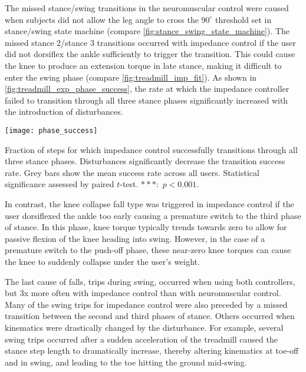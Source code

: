 The missed stance/swing transitions in the neuromuscular control were caused
when subjects did not allow the leg angle to cross the $90^\circ$ threshold set
in stance/swing state machine (compare \cref{fig:stance_swing_state_machine}).
The missed stance 2/stance 3 transitions occurred with impedance control if the
user did not dorsiflex the ankle sufficiently to trigger the transition. This
could cause the knee to produce an extension torque in late stance, making it
difficult to enter the swing phase (compare \cref{fig:treadmill_imp_fit}). As
shown in \cref{fig:treadmill_exp_phase_success}, the rate at which the impedance
controller failed to transition through all three stance phases significantly
increased with the introduction of disturbances.
\begin{marginfigure}[0in]
    \centering 
    \texttt{[image: phase\_success]}
    \caption[Fraction of steps for which impedance control successfully
    transitions through all three stance phases]{Fraction of steps for which
    impedance control successfully transitions through all three stance phases.
    Disturbances significantly decrease the transition success rate. Grey bars
    show the mean success rate across all users. Statistical significance
    assessed by paired $t$-test.  $***$:~$p <
    0.001$.}\label{fig:treadmill_exp_phase_success}
\end{marginfigure}

In contrast, the knee collapse fall type was triggered in impedance control if
the user dorsiflexed the ankle too early causing a premature switch to the third
phase of stance. In this phase, knee torque typically trends towards zero to
allow for passive flexion of the knee heading into swing. However, in the case
of a premature switch to the push-off phase, these near-zero knee torques can
cause the knee to suddenly collapse under the user's weight. 

The last cause of falls, trips during swing, occurred when using both
controllers, but 3x more often with impedance control than with neuromuscular
control. Many of the swing trips for impedance control were also preceded by a
missed transition between the second and third phases of stance. Others occurred
when kinematics were drastically changed by the disturbance. For example,
several swing trips occurred after a sudden acceleration of the treadmill caused
the stance step length to dramatically increase, thereby altering kinematics at
toe-off and in swing, and leading to the toe hitting the ground mid-swing.

